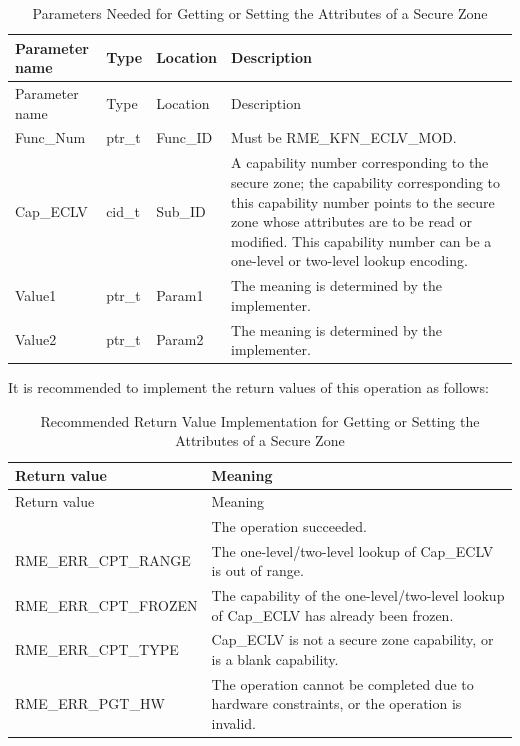 \begin{xltabular}{\textwidth}{@{}>{\hsize\raggedright\arraybackslash}X>{\hsize\raggedright\arraybackslash}X>{\hsize\raggedright\arraybackslash}X>{\hsize\raggedright\arraybackslash}X@{}}
\caption{Parameters Needed for Getting or Setting the Attributes of a Secure Zone}\label{tab:8-98-get-or-set-enclave-attributes-parameters}\\
\toprule
Parameter name & Type & Location & Description\tabularnewline
\endfirsthead
\toprule
Parameter name & Type & Location & Description\tabularnewline
\midrule
\endhead
\bottomrule
\endlastfoot
Func\_Num & ptr\_t & Func\_ID &
Must be RME\_KFN\_ECLV\_MOD.\tabularnewline
Cap\_ECLV & cid\_t & Sub\_ID &
A capability number corresponding to the secure zone; the capability corresponding to this capability number points to the secure zone whose attributes are to be read or modified. This capability number can be a one-level or two-level lookup encoding.\tabularnewline
Value1 & ptr\_t & Param1 & The meaning is determined by the implementer.\tabularnewline
Value2 & ptr\_t & Param2 & The meaning is determined by the implementer.\tabularnewline
\end{xltabular}
\nopagebreak[4]

It is recommended to implement the return values of this operation as follows:

\begin{xltabular}{\textwidth}{@{}>{\hsize\raggedright\arraybackslash}X>{\hsize\raggedright\arraybackslash}X@{}}
\caption{Recommended Return Value Implementation for Getting or Setting the Attributes of a Secure Zone}\label{tab:8-99-get-or-set-enclave-attributes-suggested-return-values}\\
\toprule
Return value & Meaning\tabularnewline
\endfirsthead
\toprule
Return value & Meaning\tabularnewline
\midrule
\endhead
\bottomrule
{} & The operation succeeded.\tabularnewline
    RME\_ERR\_CPT\_RANGE & The one-level/two-level lookup of Cap\_ECLV is out of range.\tabularnewline
    RME\_ERR\_CPT\_FROZEN & The capability of the one-level/two-level lookup of Cap\_ECLV has already been frozen.\tabularnewline
    RME\_ERR\_CPT\_TYPE & Cap\_ECLV is not a secure zone capability, or is a blank capability.\tabularnewline
    
    RME\_ERR\_PGT\_HW & The operation cannot be completed due to hardware constraints, or the operation is invalid.\tabularnewline
\end{xltabular}
\nopagebreak[4]


